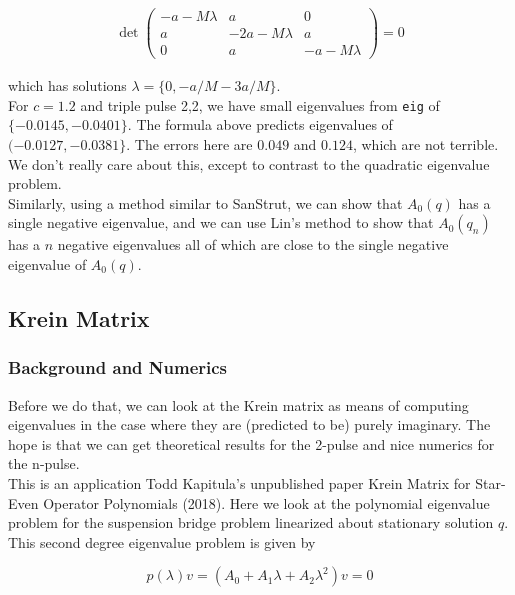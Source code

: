 \documentclass[12pt]{article}
\begin{document}
\begin{align*}
\det \begin{pmatrix}
-a - M \lambda & a & 0\\
a & -2a - M \lambda & a \\
0 & a & -a - M \lambda
\end{pmatrix} = 0
\end{align*}

which has solutions $\lambda = \{ 0, -a/M -3a/M \}$.\\

For $c = 1.2$ and triple pulse 2,2, we have small eigenvalues from \texttt{eig} of $\{ -0.0145, -0.0401 \}$. The formula above predicts eigenvalues of $( -0.0127, -0.0381 \}$. The errors here are $0.049$ and $0.124$, which are not terrible.\\

We don't really care about this, except to contrast to the quadratic eigenvalue problem.\\

Similarly, using a method similar to SanStrut, we can show that $A_0(q)$ has a single negative eigenvalue, and we can use Lin's method to show that $A_0(q_n)$ has a $n$ negative eigenvalues all of which are close to the single negative eigenvalue of $A_0(q)$.

\subsection{Krein Matrix}

\subsubsection{Background and Numerics}

Before we do that, we can look at the Krein matrix as means of computing eigenvalues in the case where they are (predicted to be) purely imaginary. The hope is that we can get theoretical results for the 2-pulse and nice numerics for the n-pulse.
\\

This is an application Todd Kapitula's unpublished paper Krein Matrix for Star-Even Operator Polynomials (2018). Here we look at the polynomial eigenvalue problem for the suspension bridge problem linearized about stationary solution $q$. This second degree eigenvalue problem is given by

\begin{equation}
p(\lambda)v = (A_0 + A_1 \lambda + A_2 \lambda^2 )v = 0
\end{equation}
\end{document}
